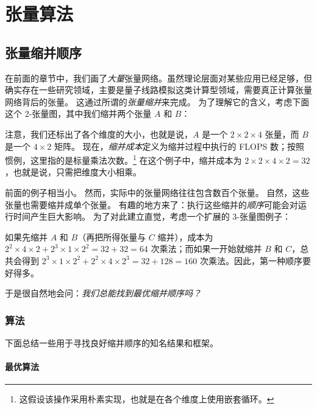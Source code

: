 
\chapter{张量算法}

\section{张量缩并顺序}\label{sec:opt_contr}

在前面的章节中，我们画了\emph{大量}张量网络。虽然理论层面对某些应用已经足够，但确实存在一些研究领域，主要是量子线路模拟这类计算型领域，需要真正计算张量网络背后的张量。
这通过所谓的\emph{张量缩并}来完成。
为了理解它的含义，考虑下面这个 2-张量图，其中我们缩并两个张量 $A$ 和 $B$：
\begin{center}
    \resizebox{0.44\textwidth}{!}{
        
    }
\end{center}
注意，我们还标出了各个维度的大小，也就是说，$A$ 是一个 $2\times 2\times 4$ 张量，而 $B$ 是一个 $4 \times 2$ 矩阵。
现在，\emph{缩并成本}定义为缩并过程中执行的 FLOPS 数；按照惯例，这里指的是标量乘法次数。\footnote{这假设该操作采用朴素实现，也就是在各个维度上使用嵌套循环。}
在这个例子中，缩并成本为 $2 \times 2 \times 4 \times 2 = 32$，也就是说，只需把维度大小相乘。

前面的例子相当小。
然而，实际中的张量网络往往包含数百个张量。
自然，这些张量也需要缩并成单个张量。
有趣的地方来了：执行这些缩并的\emph{顺序}可能会对运行时间产生巨大影响。
为了对此建立直觉，考虑一个扩展的 3-张量图例子：
\begin{center}
    \resizebox{0.35\textwidth}{!}{
        
    }
\end{center}
如果先缩并 $A$ 和 $B$（再把所得张量与 $C$ 缩并），成本为 $2^2 \times 4\times 2 + 2^3 \times 1 \times 2^2 = 32 + 32 = 64$ 次乘法；而如果一开始就缩并 $B$ 和 $C$，总共会得到 $2^3 \times 1 \times 2^2 + 2^2 \times 4 \times 2^3 = 32 + 128 = 160$ 次乘法。因此，第一种顺序要好得多。

于是很自然地会问：\emph{我们总能找到最优缩并顺序吗？}

\subsection{算法}

下面总结一些用于寻找良好缩并顺序的知名结果和框架。

\subsubsection{最优算法}

